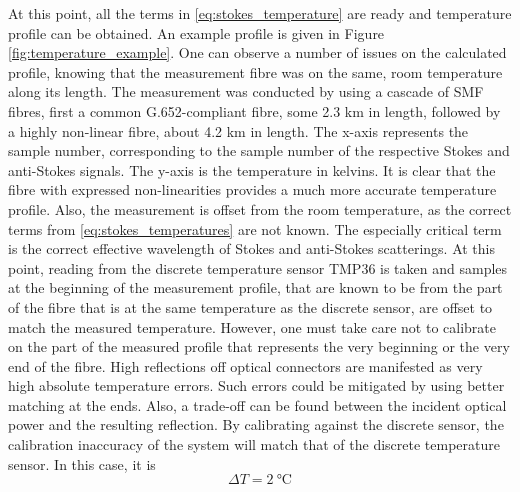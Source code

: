 \documentclass{standalone}
\begin{document}
At this point, all the terms in \ref{eq:stokes_temperature} are ready and temperature profile can be obtained. An example profile is given in Figure \ref{fig:temperature_example}.
One can observe a number of issues on the calculated profile, knowing that the measurement fibre was on the same, room temperature along its length. The measurement was conducted by using a cascade of SMF fibres, first a common G.652-compliant fibre, some 2.3 km in length, followed by a highly non-linear fibre, about 4.2 km in length. The x-axis represents the sample number, corresponding to the sample number of the respective Stokes and anti-Stokes signals. The y-axis is the temperature in kelvins. It is clear that the fibre with expressed non-linearities provides a much more accurate temperature profile. Also, the measurement is offset from the room temperature, as the correct terms from \ref{eq:stokes_temperatures} are not known. The especially critical term is the correct effective wavelength of Stokes and anti-Stokes scatterings. At this point, reading from the discrete temperature sensor TMP36 is taken and samples at the beginning of the measurement profile, that are known to be from the part of the fibre that is at the same temperature as the discrete sensor, are offset to match the measured temperature. However, one must take care not to calibrate on the part of the measured profile that represents the very beginning or the very end of the fibre. High reflections off optical connectors are manifested as very high absolute temperature errors. Such errors could be mitigated by using better matching at the ends. Also, a trade-off can be found between the incident optical power and the resulting reflection. By calibrating against the discrete sensor, the calibration inaccuracy of the system will match that of the discrete temperature sensor. In this case, it is
\begin{equation}
\varDelta T = \SI{2}{\celsius}
\end{equation}
\end{document}

